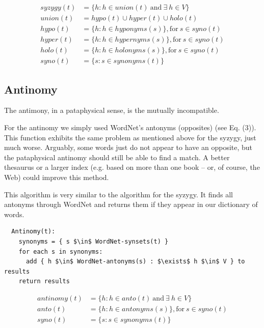 \begin{equation}
\begin{split}
  syzygy(t) &= \{ h \colon h \in union(t) \ \text{and} \ \exists \ h \in V \}\\
  union(t) &= hypo(t) \cup hyper(t) \cup holo(t)\\
  hypo(t) &= \{ h \colon h \in hyponyms(s) \}, \text{for} \ s \in syno(t)\\
  hyper(t) &= \{ h \colon h \in hypernyms(s) \}, \text{for} \ s \in syno(t)\\
  holo(t) &= \{ h \colon h \in holonyms(s) \}, \text{for} \ s \in syno(t)\\
  syno(t) &= \{ s \colon s \in synonyms(t) \}
\end{split}
\label{eq:syzygy}
\end{equation}

\subsection{Antinomy}

The antimony, in a pataphysical sense, is the mutually incompatible.

For the antinomy we simply used WordNet’s antonyms (opposites) (see Eq. (3)). This function exhibits the same problem as mentioned above for the syzygy, just much worse.  Arguably, some words just do not appear to have an opposite, but the pataphysical antinomy should still be able to find a match. A better thesaurus or a larger index (e.g. based on more than one book – or, of course, the Web) could improve this method.

This algorithm is very similar to the algorithm for the syzygy. It finds all antonyms through WordNet and returns them if they appear in our dictionary of words.

\begin{lstlisting}
  Antinomy(t):
    synonyms = { s $\in$ WordNet-synsets(t) }
    for each s in synonyms:
      add { h $\in$ WordNet-antonyms(s) : $\exists$ h $\in$ V } to results
    return results
\end{lstlisting}

\begin{equation}
  \begin{split}
  antinomy( t ) &= \{ h \colon h \in anto( t ) \ \text{and} \ \exists \ h \in V \}\\
  anto( t ) &= \{ h \colon h \in antonyms( s ) \}, \text{for} \ s \in syno( t )\\
  syno( t ) &= \{ s \colon s \in synonyms( t ) \}
  \end{split}
\label{eq:antinomy}
\end{equation}

